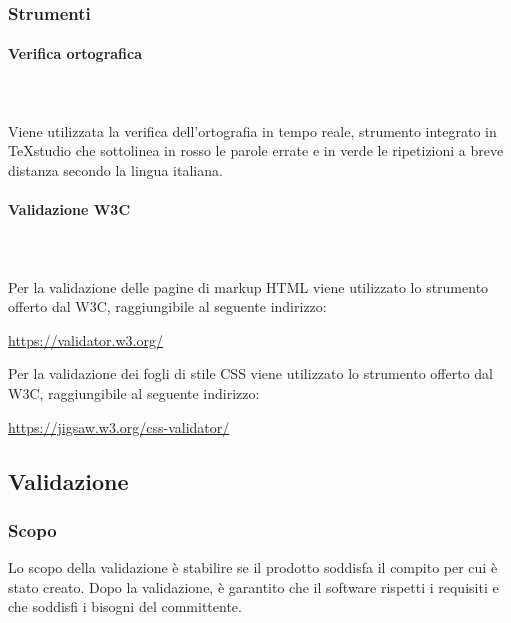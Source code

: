 	\subsubsection{Strumenti}
		\paragraph{Verifica ortografica} \mbox{}\\ \mbox{}\\
		Viene utilizzata la verifica dell'ortografia in tempo reale, strumento integrato in \TeX{}studio che sottolinea in rosso le parole errate e in verde le ripetizioni a breve distanza secondo la lingua italiana.
		\paragraph{Validazione W3C} \mbox{}\\ \mbox{}\\
		Per la validazione delle pagine di markup HTML viene utilizzato lo strumento offerto dal W3C, raggiungibile al seguente indirizzo: \newline
		\centerline{\url{https://validator.w3.org/}} \newline \newline
		Per la validazione dei fogli di stile CSS viene utilizzato lo strumento offerto dal W3C, raggiungibile al seguente indirizzo: \newline
		\centerline{\url{https://jigsaw.w3.org/css-validator/}} \newline

\subsection{Validazione}
	\subsubsection{Scopo}
	Lo scopo della validazione è stabilire se il prodotto soddisfa il compito per cui è stato creato. Dopo la validazione, è garantito che il software rispetti i requisiti e che soddisfi i bisogni del committente.

